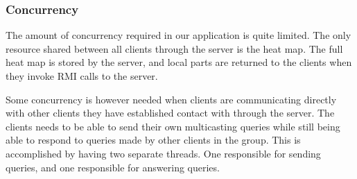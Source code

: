 
\subsubsection{Concurrency}



The amount of concurrency required in our application is quite limited. The only resource shared between all clients through the server is the heat map. The full heat map is stored by the server, and local parts are returned to the clients when they invoke RMI calls to the server.





Some concurrency is however needed when clients are communicating directly with other clients they have established contact with through the server. The clients needs to be able to send their own multicasting queries while still being able to respond to queries made by other clients in the group. This is accomplished by having two separate threads. One responsible for sending queries, and one responsible for answering queries.